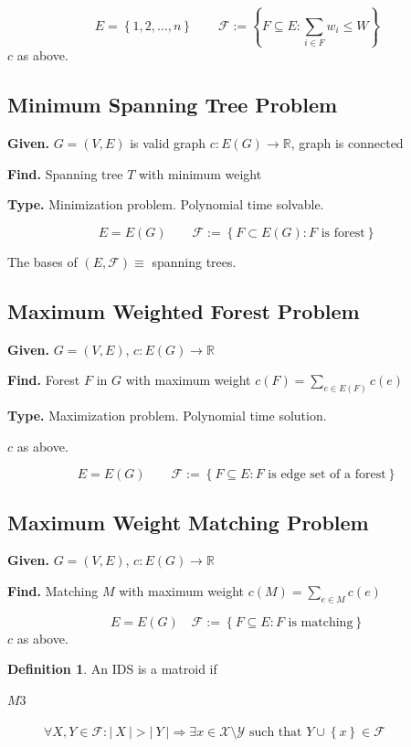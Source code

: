 \documentclass[a4paper]{article}
\theoremstyle{definition}
\newtheorem{definition}[theorem]{Definition}
\newcommand{\card}[1]{\left|\:\!#1\:\!\right|}
\newcommand{\set}[1]{\left\{#1\right\}}
\newcommand{\given}[1]{\textbf{Given.} #1\par}
\newcommand{\find}[1]{\textbf{Find.} #1\par}
\begin{document}
\[
  E = \set{1, 2, \ldots, n} \qquad
  \mathcal{F} := \set{F \subseteq E: \sum_{i \in F} w_i \leq W}
\]
$c$ as above.

\subsection{Minimum Spanning Tree Problem}
\given{$G = (V, E)$ is valid graph $c: E(G) \rightarrow \mathbb{R}$, graph is connected}
\find{Spanning tree $T$ with minimum weight}
\textbf{Type.} Minimization problem. Polynomial time solvable.\par

\[ E = E(G) \qquad \mathcal{F} := \set{F \subset E(G): F \text{ is forest}} \]

The bases of $(E, \mathcal{F}) \equiv$ spanning trees.

\subsection{Maximum Weighted Forest Problem}
%
\given{$G = (V, E)$, $c: E(G) \rightarrow \mathbb{R}$}
\find{Forest $F$ in $G$ with maximum weight $c(F) = \sum_{e \in E(F)} c(e)$}
\textbf{Type.} Maximization problem. Polynomial time solution.\par

$c$ as above.

\[
  E = E(G) \qquad \mathcal{F} := \set{F \subseteq E: F \text{ is edge set of a forest}}
\]

\subsection{Maximum Weight Matching Problem}
%
\given{$G = (V, E)$, $c: E(G) \rightarrow \mathbb{R}$}
\find{Matching $M$ with maximum weight $c(M) = \sum_{e \in M} c(e)$}

\[
  E = E(G) \quad
  \mathcal{F} := \set{F \subseteq E: F \text{ is matching}}
\]
$c$ as above.

\begin{definition}
  An IDS is a matroid if
  \begin{description}
    \item[$M3$] $\forall X, Y \in \mathcal{F}: \card{X} > \card{Y}
        \Rightarrow \exists x \in \mathcal{X} \setminus \mathcal{Y}
          \text{ such that } Y \cup \set{x} \in \mathcal{F}$
  \end{description}
\end{definition}
\end{document}
